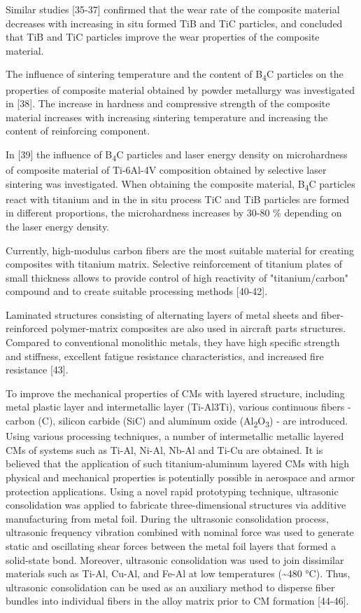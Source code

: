 \begin{multicols}{2}
Similar studies {[}35-37{]} confirmed that the wear rate of the
composite material decreases with increasing in situ formed TiB and TiC
particles, and concluded that TiB and TiC particles improve the wear
properties of the composite material.

The influence of sintering temperature and the content of
B\textsubscript{4}C particles on the properties of composite material
obtained by powder metallurgy was investigated in {[}38{]}. The increase
in hardness and compressive strength of the composite material increases
with increasing sintering temperature and increasing the content of
reinforcing component.

In {[}39{]} the influence of B\textsubscript{4}C particles and laser
energy density on microhardness of composite material of Ti-6Al-4V
composition obtained by selective laser sintering was investigated. When
obtaining the composite material, B\textsubscript{4}C particles react
with titanium and in the in situ process TiC and TiB particles are
formed in different proportions, the microhardness increases by 30-80 \%
depending on the laser energy density.

Currently, high-modulus carbon fibers are the most suitable material for
creating composites with titanium matrix. Selective reinforcement of
titanium plates of small thickness allows to provide control of high
reactivity of "titanium/carbon" compound and to create suitable
processing methods {[}40-42{]}.

Laminated structures consisting of alternating layers of metal sheets
and fiber-reinforced polymer-matrix composites are also used in aircraft
parts structures. Compared to conventional monolithic metals, they have
high specific strength and stiffness, excellent fatigue resistance
characteristics, and increased fire resistance {[}43{]}.

To improve the mechanical properties of CMs with layered structure,
including metal plastic layer and intermetallic layer (Ti-Al3Ti),
various continuous fibers - carbon (C), silicon carbide (SiC) and
aluminum oxide (Al\textsubscript{2}O\textsubscript{3}) - are introduced.
Using various processing techniques, a number of intermetallic metallic
layered CMs of systems such as Ti-Al, Ni-Al, Nb-Al and Ti-Cu are
obtained. It is believed that the application of such titanium-aluminum
layered CMs with high physical and mechanical properties is potentially
possible in aerospace and armor protection applications. Using a novel
rapid prototyping technique, ultrasonic consolidation was applied to
fabricate three-dimensional structures via additive manufacturing from
metal foil. During the ultrasonic consolidation process, ultrasonic
frequency vibration combined with nominal force was used to generate
static and oscillating shear forces between the metal foil layers that
formed a solid-state bond. Moreover, ultrasonic consolidation was used
to join dissimilar materials such as Ti-Al, Cu-Al, and Fe-Al at low
temperatures (\textasciitilde480 °C). Thus, ultrasonic consolidation can
be used as an auxiliary method to disperse fiber bundles into individual
fibers in the alloy matrix prior to CM formation {[}44-46{]}.


\end{multicols}
